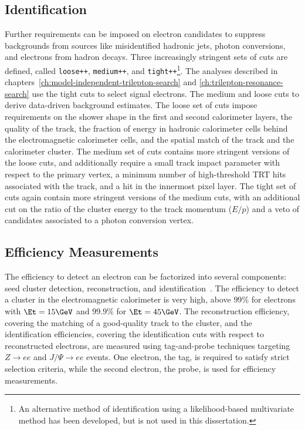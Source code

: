 \subsection{Identification}\label{sec:reco-electron-identification}
Further requirements can be imposed on electron candidates to suppress backgrounds from sources like misidentified hadronic jets, photon conversions, and electrons from hadron decays. Three increasingly stringent sets of cuts are defined, called \texttt{loose++}, \texttt{medium++}, and \texttt{tight++}\footnote{An alternative method of identification using a likelihood-based multivariate method has been developed, but is not used in this dissertation.}. The analyses described in chapters~\ref{ch:model-independent-trilepton-search} and \ref{ch:trilepton-resonance-search} use the tight cuts to select signal electrons. The medium and loose cuts to derive data-driven background estimates. The loose set of cuts impose requirements on the shower shape in the first and second calorimeter layers, the quality of the track, the fraction of energy in hadronic calorimeter cells behind the electromagnetic calorimeter cells, and the spatial match of the track and the calorimeter cluster. The medium set of cuts contains more stringent versions of the loose cuts, and additionally require a small track impact parameter with respect to the primary vertex, a minimum number of high-threshold TRT hits associated with the track, and a hit in the innermost pixel layer. The tight set of cuts again contain more stringent versions of the medium cuts, with an additional cut on the ratio of the cluster energy to the track momentum ($E/p$) and a veto of candidates associated to a photon conversion vertex. 


\subsection{Efficiency Measurements}\label{sec:reco-electron-efficiency}
The efficiency to detect an electron can be factorized into several components: seed cluster detection, reconstruction, and identification~\cite{TheATLASCollaboration:2014vz}. The efficiency to detect a cluster in the electromagnetic calorimeter is very high, above $99\%$ for electrons with $\Et=15 \GeV$ and $99.9\%$ for $\Et=45 \GeV$. The reconstruction efficiency, covering the matching of a good-quality track to the cluster, and the identification efficiencies, covering the identification cuts with respect to reconstructed electrons, are measured using tag-and-probe techniques targeting $Z\rightarrow ee$ and $J/\Psi\rightarrow ee$ events. One electron, the tag, is required to satisfy strict selection criteria, while the second electron, the probe, is used for efficiency measurements. 

